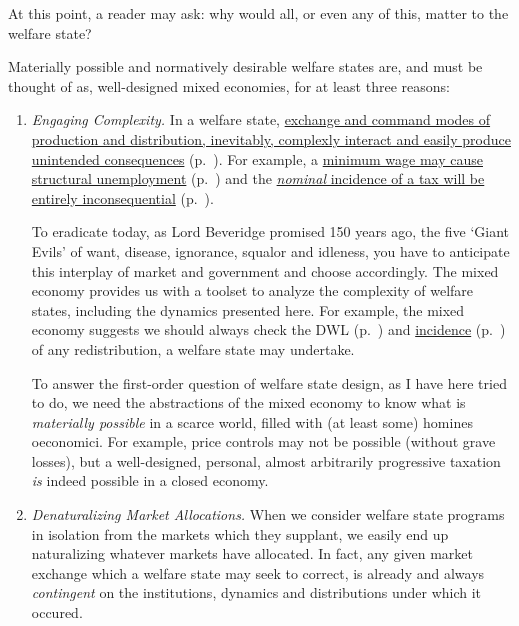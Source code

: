 At this point, a reader may ask: why would all, or even any of this, matter to the welfare state?

Materially possible and normatively desirable welfare states are, and must be thought of as, well-designed mixed economies, for at least three reasons:

\begin{enumerate}
	\item \emph{Engaging Complexity.} In a welfare state, \hyperref[sec:interface]{exchange and command modes of production and distribution, inevitably, complexly interact and easily produce unintended consequences} (p.~\pageref{sec:interface}). For example, a \hyperref[sec:princecontrols]{minimum wage may cause structural unemployment} (p.~\pageref{sec:price-controls}) and the \hyperref[sec:well-determinedincidence]{\emph{nominal} incidence of a tax will be entirely inconsequential} (p.~\pageref{sec:well-determinedincidence}). 
	
	To eradicate today, as Lord Beveridge promised 150 years ago, the five `Giant Evils' of want, disease, ignorance, squalor and idleness, you have to anticipate this interplay of market and government and choose accordingly. The mixed economy provides us with a toolset to analyze the complexity of welfare states, including the dynamics presented here. For example, the mixed economy suggests we should always check the \gls{DWL} (p.~\pageref{sec:minimalDWL}) and \hyperref[sec:well-determinedincidence]{incidence} (p.~\pageref{sec:well-determinedincidence}) of any redistribution, a welfare state may undertake.
	
	To answer the first-order question of welfare state design, as I have here tried to do, we need the abstractions of the mixed economy to know what is \emph{materially possible} in a scarce world, filled with (at least some) homines oeconomici. For example, price controls may not be possible (without grave losses), but a well-designed, personal, almost arbitrarily progressive taxation \emph{is} indeed possible in a closed economy.	
	
	\item \emph{Denaturalizing Market Allocations.} When we consider welfare state programs in isolation from the markets which they supplant, we easily end up naturalizing whatever markets have allocated. In fact, any given market exchange which a welfare state may seek to correct, is already and always \emph{contingent} on the institutions, dynamics and distributions under which it occured. 
	

\end{enumerate}
